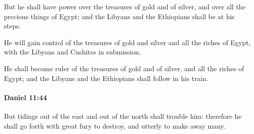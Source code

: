 			\begin{versebox}
					\item[BHS] 
					\item[LXX] 
					\item[ASV] But he shall have power over the treasures of gold and of silver, and over all the precious things of Egypt; and the Libyans and the Ethiopians shall be at his steps.
					\item[NIV] He will gain control of the treasures of gold and silver and all the riches of Egypt, with the Libyans and Cushites in submission.
					\item[NRSV] He shall become ruler of the treasures of gold and of silver, and all the riches of Egypt; and the Libyans and the Ethiopians shall follow in his train.
			\end{versebox}

		\paragraph{Daniel 11:44} %
			\label{DANIEL-11-44}

			But tidings out of the east and out of the north shall trouble him: therefore he shall go forth with great fury to destroy, and utterly to make away many.

